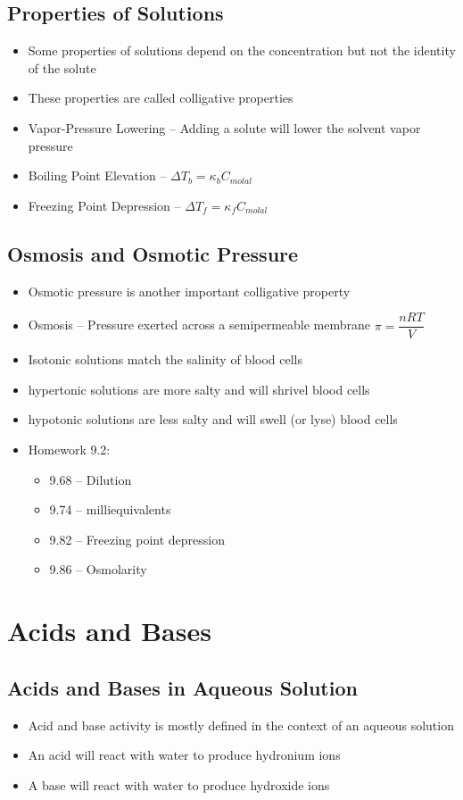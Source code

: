 \documentclass[12pt, openany, letterpaper]{memoir}
\begin{document}
\section{Properties of Solutions}
\begin{itemize}
	\item Some properties of solutions depend on the concentration but not the identity of the solute
	\item These properties are called colligative properties
	\item Vapor-Pressure Lowering -- Adding a solute will lower the solvent vapor pressure
	\item Boiling Point Elevation -- $\Delta T_b = \kappa_b C_{molal}$
	\item Freezing Point Depression -- $\Delta T_f = \kappa_f C_{molal}$
\end{itemize}
\section{Osmosis and Osmotic Pressure}
\begin{itemize}
	\item Osmotic pressure is another important colligative property
	\item Osmosis -- Pressure exerted across a semipermeable membrane $\pi = \dfrac{nRT}{V}$
	\item Isotonic solutions match the salinity of blood cells
	\item hypertonic solutions are more salty and will shrivel blood cells
	\item hypotonic solutions are less salty and will swell (or lyse) blood cells
	\item Homework 9.2:
	      \begin{itemize}
		      \item 9.68 -- Dilution
		      \item 9.74 -- milliequivalents
		      \item 9.82 -- Freezing point depression
		      \item 9.86 -- Osmolarity
	      \end{itemize}
\end{itemize}

\chapter{Acids and Bases}
\section{Acids and Bases in Aqueous Solution}
\begin{itemize}
	\item Acid and base activity is mostly defined in the context of an aqueous solution
	\item An acid will react with water to produce hydronium ions
	\item A base will react with water to produce hydroxide ions
\end{itemize}
\end{document}
